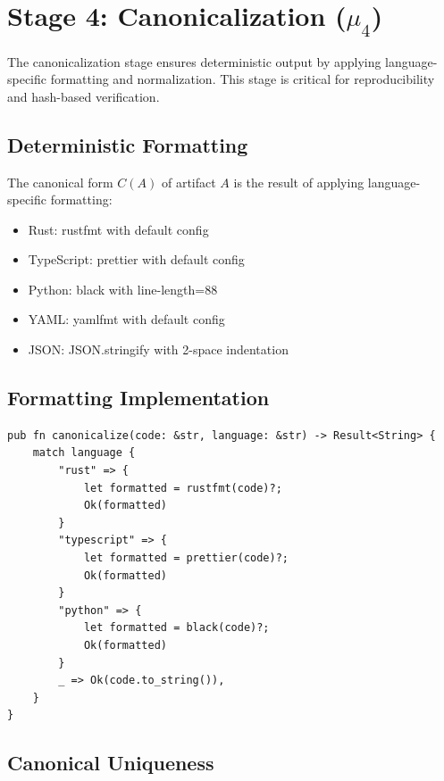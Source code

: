 \section{Stage 4: Canonicalization (\(\mu_4\))}

The canonicalization stage ensures deterministic output by applying language-specific formatting and normalization. This stage is critical for reproducibility and hash-based verification.

\subsection{Deterministic Formatting}

\begin{definition}
    The canonical form \(C(A)\) of artifact \(A\) is the result of applying language-specific formatting:
    \begin{itemize}
        \item Rust: rustfmt with default config
        \item TypeScript: prettier with default config
        \item Python: black with line-length=88
        \item YAML: yamlfmt with default config
        \item JSON: JSON.stringify with 2-space indentation
    \end{itemize}
\end{definition}

\subsection{Formatting Implementation}

\begin{verbatim}
pub fn canonicalize(code: &str, language: &str) -> Result<String> {
    match language {
        "rust" => {
            let formatted = rustfmt(code)?;
            Ok(formatted)
        }
        "typescript" => {
            let formatted = prettier(code)?;
            Ok(formatted)
        }
        "python" => {
            let formatted = black(code)?;
            Ok(formatted)
        }
        _ => Ok(code.to_string()),
    }
}
\end{verbatim}

\subsection{Canonical Uniqueness}

